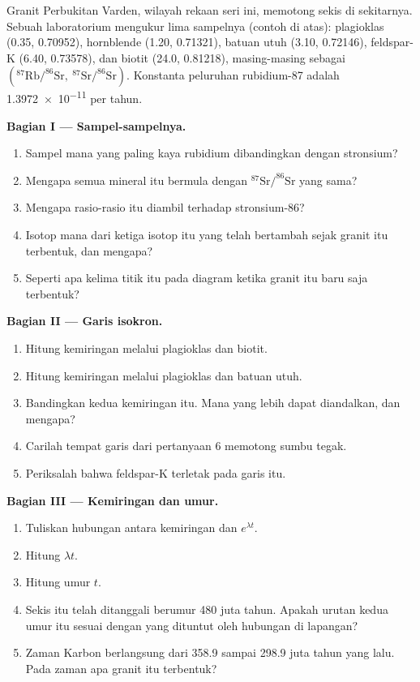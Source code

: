 \begin{problem}
\label{pb:g12:age-of-the-earth:1}
Granit Perbukitan Varden, wilayah rekaan seri ini, memotong sekis di
sekitarnya. Sebuah laboratorium mengukur lima sampelnya (contoh di atas):
plagioklas (0.35, 0.70952), hornblende (1.20, 0.71321), batuan utuh (3.10,
0.72146), feldspar-K (6.40, 0.73578), dan biotit (24.0, 0.81218), masing-masing
sebagai
$(^{87}\mathrm{Rb}/^{86}\mathrm{Sr},\ ^{87}\mathrm{Sr}/^{86}\mathrm{Sr})$.
Konstanta peluruhan rubidium-87 adalah \num{1.3972e-11} per tahun.

\medskip
\noindent\textbf{Bagian I --- Sampel-sampelnya.}
\begin{enumerate}
  \item Sampel mana yang paling kaya rubidium dibandingkan dengan stronsium?
  \item Mengapa semua mineral itu bermula dengan
        $^{87}\mathrm{Sr}/^{86}\mathrm{Sr}$ yang sama?
  \item Mengapa rasio-rasio itu diambil terhadap stronsium-86?
  \item Isotop mana dari ketiga isotop itu yang telah bertambah sejak granit
        itu terbentuk, dan mengapa?
  \item Seperti apa kelima titik itu pada diagram ketika granit itu baru saja
        terbentuk?
\end{enumerate}

\medskip
\noindent\textbf{Bagian II --- Garis isokron.}
\begin{enumerate}[resume]
  \item Hitung kemiringan melalui plagioklas dan biotit.
  \item Hitung kemiringan melalui plagioklas dan batuan utuh.
  \item Bandingkan kedua kemiringan itu. Mana yang lebih dapat diandalkan, dan
        mengapa?
  \item Carilah tempat garis dari pertanyaan 6 memotong sumbu tegak.
  \item Periksalah bahwa feldspar-K terletak pada garis itu.
\end{enumerate}

\medskip
\noindent\textbf{Bagian III --- Kemiringan dan umur.}
\begin{enumerate}[resume]
  \item Tuliskan hubungan antara kemiringan dan $e^{\lambda t}$.
  \item Hitung $\lambda t$.
  \item Hitung umur $t$.
  \item Sekis itu telah ditanggali berumur 480 juta tahun. Apakah urutan kedua
        umur itu sesuai dengan yang dituntut oleh hubungan di lapangan?
  \item Zaman Karbon berlangsung dari 358.9 sampai 298.9 juta tahun yang lalu.
        Pada zaman apa granit itu terbentuk?
\end{enumerate}


\end{problem}
